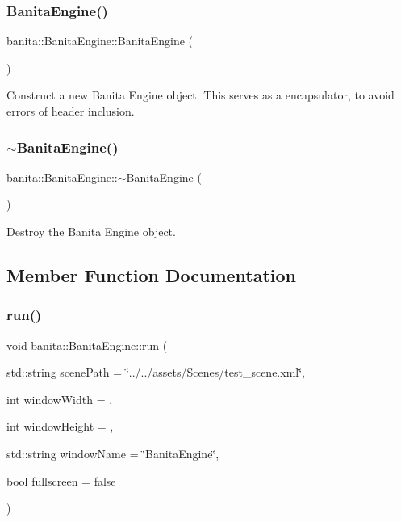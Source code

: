\subsubsection{\texorpdfstring{BanitaEngine()}{BanitaEngine()}}
{\footnotesize\ttfamily banita\+::\+Banita\+Engine\+::\+Banita\+Engine (\begin{DoxyParamCaption}{ }\end{DoxyParamCaption})}



Construct a new Banita Engine object. This serves as a encapsulator, to avoid errors of header inclusion. 

\mbox{\label{classbanita_1_1_banita_engine_a9bd490383a9a8baaed3a2b4a3d8c7bcc}} 
\subsubsection{\texorpdfstring{$\sim$BanitaEngine()}{~BanitaEngine()}}
{\footnotesize\ttfamily banita\+::\+Banita\+Engine\+::$\sim$\+Banita\+Engine (\begin{DoxyParamCaption}{ }\end{DoxyParamCaption})\hspace{0.3cm}{\ttfamily [inline]}}



Destroy the Banita Engine object. 



\subsection{Member Function Documentation}
\mbox{\label{classbanita_1_1_banita_engine_ac2b3d79609be0bad75ec9ed6b5b3cd1f}} 
\subsubsection{\texorpdfstring{run()}{run()}}
{\footnotesize\ttfamily void banita\+::\+Banita\+Engine\+::run (\begin{DoxyParamCaption}\item[{std\+::string}]{scene\+Path = {\ttfamily \char`\"{}../../assets/Scenes/test\+\_\+scene.xml\char`\"{}},  }\item[{int}]{window\+Width = {},  }\item[{int}]{window\+Height = {},  }\item[{std\+::string}]{window\+Name = {\ttfamily \char`\"{}BanitaEngine\char`\"{}},  }\item[{bool}]{fullscreen = {\ttfamily false} }\end{DoxyParamCaption})}




